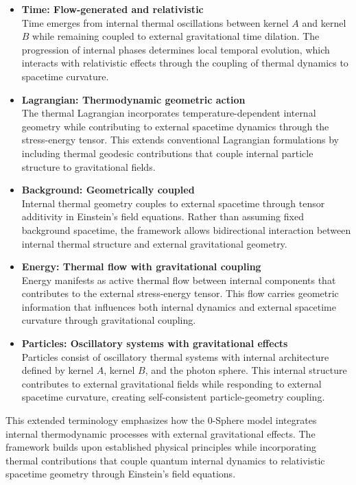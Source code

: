 \documentclass[%
 reprint,
 amsmath,amssymb,
 aps,
]{revtex4-1}
\numberwithin{equation}{section}%
\begin{document}
\begin{itemize}
   \item \textbf{Time: Flow-generated and relativistic} \\
   Time emerges from internal thermal oscillations between kernel $A$ and kernel $B$ while remaining coupled to external gravitational time dilation. The progression of internal phases determines local temporal evolution, which interacts with relativistic effects through the coupling of thermal dynamics to spacetime curvature.

   \item \textbf{Lagrangian: Thermodynamic geometric action} \\
   The thermal Lagrangian incorporates temperature-dependent internal geometry while contributing to external spacetime dynamics through the stress-energy tensor. This extends conventional Lagrangian formulations by including thermal geodesic contributions that couple internal particle structure to gravitational fields.

   \item \textbf{Background: Geometrically coupled} \\
   Internal thermal geometry couples to external spacetime through tensor additivity in Einstein's field equations. Rather than assuming fixed background spacetime, the framework allows bidirectional interaction between internal thermal structure and external gravitational geometry.

   \item \textbf{Energy: Thermal flow with gravitational coupling} \\
   Energy manifests as active thermal flow between internal components that contributes to the external stress-energy tensor. This flow carries geometric information that influences both internal dynamics and external spacetime curvature through gravitational coupling.

   \item \textbf{Particles: Oscillatory systems with gravitational effects} \\
   Particles consist of oscillatory thermal systems with internal architecture defined by kernel $A$, kernel $B$, and the photon sphere. This internal structure contributes to external gravitational fields while responding to external spacetime curvature, creating self-consistent particle-geometry coupling.
\end{itemize}

This extended terminology emphasizes how the 0-Sphere model integrates internal thermodynamic processes with external gravitational effects. The framework builds upon established physical principles while incorporating thermal contributions that couple quantum internal dynamics to relativistic spacetime geometry through Einstein's field equations.
\end{document}
